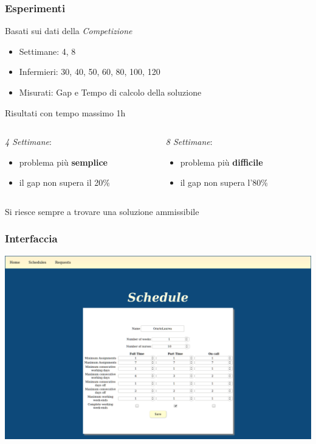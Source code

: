\documentclass[xcolor={dvipsnames, table}]{beamer}
\begin{document}
\begin{frame}
\frametitle{Esperimenti}
Basati sui dati della \textit{Competizione}
\begin{itemize}
	\item Settimane: 4, 8
	\item Infermieri: 30, 40, 50, 60, 80, 100, 120
	\item Misurati: Gap e Tempo di calcolo della soluzione
\end{itemize}
\begin{block}{Risultati con tempo massimo 1h}
	\begin{columns}
	\begin{column}{0.4\linewidth}
	\textit{4 Settimane}:
	\begin{itemize}
	\item problema più \textbf{semplice}
	\item il gap non supera il 20\%

	\end{itemize}
	\end{column}
	\begin{column}{0.5\linewidth}
	
	\textit{8 Settimane}:
	\begin{itemize}
	\item problema più \textbf{difficile}
	\item il gap non supera l'80\%
	\end{itemize}
	\end{column}
	\end{columns}
\end{block}
\medskip 
Si riesce sempre a trovare una soluzione ammissibile
\end{frame}

\begin{frame}
\frametitle{Interfaccia}
\begin{center}
\includegraphics[width=\linewidth]{img/Schermate/S2.png}
\end{center}
\end{frame}
\end{document}
